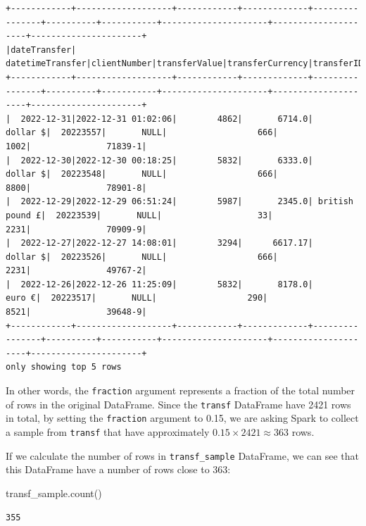 \documentclass[
  11pt,
  letterpaper,
  DIV=11,
  numbers=noendperiod]{scrreprt}
\newenvironment{Shaded}{\begin{snugshade}}{\end{snugshade}}
\newcommand{\NormalTok}[1]{\textcolor[rgb]{0.00,0.23,0.31}{#1}}
\begin{document}
\begin{verbatim}
+------------+-------------------+------------+-------------+----------------+----------+-----------+---------------------+---------------------+----------------------+
|dateTransfer|   datetimeTransfer|clientNumber|transferValue|transferCurrency|transferID|transferLog|destinationBankNumber|destinationBankBranch|destinationBankAccount|
+------------+-------------------+------------+-------------+----------------+----------+-----------+---------------------+---------------------+----------------------+
|  2022-12-31|2022-12-31 01:02:06|        4862|       6714.0|        dollar $|  20223557|       NULL|                  666|                 1002|               71839-1|
|  2022-12-30|2022-12-30 00:18:25|        5832|       6333.0|        dollar $|  20223548|       NULL|                  666|                 8800|               78901-8|
|  2022-12-29|2022-12-29 06:51:24|        5987|       2345.0| british pound £|  20223539|       NULL|                   33|                 2231|               70909-9|
|  2022-12-27|2022-12-27 14:08:01|        3294|      6617.17|        dollar $|  20223526|       NULL|                  666|                 2231|               49767-2|
|  2022-12-26|2022-12-26 11:25:09|        5832|       8178.0|          euro €|  20223517|       NULL|                  290|                 8521|               39648-9|
+------------+-------------------+------------+-------------+----------------+----------+-----------+---------------------+---------------------+----------------------+
only showing top 5 rows
\end{verbatim}

In other words, the \texttt{fraction} argument represents a fraction of
the total number of rows in the original DataFrame. Since the
\texttt{transf} DataFrame have 2421 rows in total, by setting the
\texttt{fraction} argument to 0.15, we are asking Spark to collect a
sample from \texttt{transf} that have approximately
\(0.15 \times 2421 \approx 363\) rows.

If we calculate the number of rows in \texttt{transf\_sample} DataFrame,
we can see that this DataFrame have a number of rows close to 363:

\begin{Shaded}
\begin{Highlighting}[]
\NormalTok{transf\_sample.count()}
\end{Highlighting}
\end{Shaded}

\begin{verbatim}
355
\end{verbatim}
\end{document}

